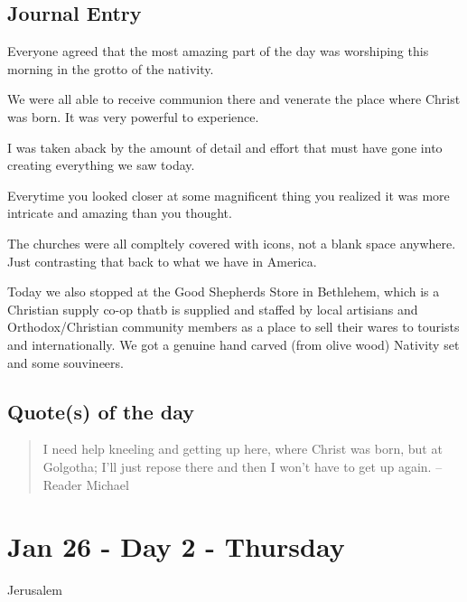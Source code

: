 \documentclass[letterpaper]{report}
\begin{document}
\clearpage
\begin{multicols}{2}
\subsection{Journal Entry}
Everyone agreed that the most amazing part of the day was worshiping this morning in
the grotto of the nativity.

We were all able to receive communion there and venerate the place where Christ was born.
It was very powerful to experience.

I was taken aback by the amount of detail and effort that must have gone into creating everything we saw today.

Everytime you looked closer at some magnificent thing you realized it was more intricate and amazing than you thought.

The churches were all compltely covered with icons, not a blank space anywhere.  Just contrasting that back to what we have in America.

Today we also stopped at the Good Shepherds Store in Bethlehem,
which is a Christian supply co-op thatb is supplied and staffed by local artisians and Orthodox/Christian community members as a place to sell their wares to tourists and internationally. 
We got a genuine hand carved (from olive wood) Nativity set and some souvineers.

\subsection{Quote(s) of the day}
\begin{quote}
 I need help kneeling and getting up here, where Christ was born, but at Golgotha;
I'll just repose there and then I won't have to get up again.
-- Reader Michael
\end{quote}
\end{multicols}

\clearpage
\section{Jan 26 - Day 2 - Thursday}
Jerusalem
\end{document}
